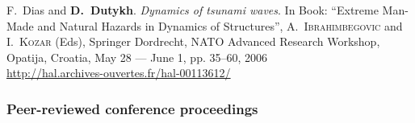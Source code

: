 \begin{etaremune}

  
  \item F.~Dias and \textbf{D.~Dutykh}. \textit{Dynamics of tsunami waves}. In Book: ``Extreme Man-Made and Natural Hazards in Dynamics of Structures'', A.~\textsc{Ibrahimbegovic} and I.~\textsc{Kozar} (Eds), Springer Dordrecht, NATO Advanced Research Workshop, Opatija, Croatia, May 28 --- June 1, pp. 35--60, 2006 \\ %
  \url{http://hal.archives-ouvertes.fr/hal-00113612/}
  
\end{etaremune}

\separator
\subsubsection{Peer-reviewed conference proceedings}

